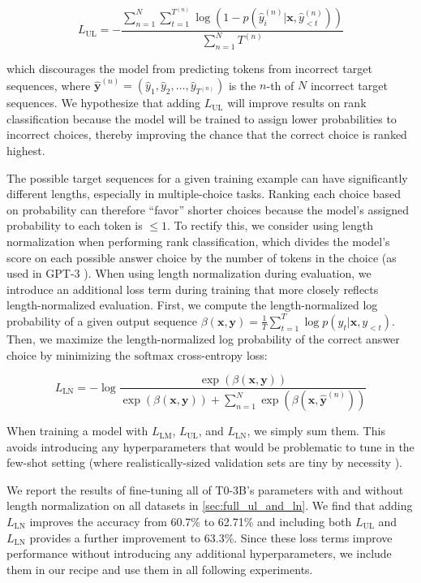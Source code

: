 \begin{equation}
    L_{\mathrm{UL}}=-\frac{ \sum_{n=1}^{N}\sum_{t=1}^{T^{(n)}} \log (1 - p(\hat{y}^{(n)}_i | \mathbf{x}, \hat{y}^{(n)}_{<t}))}{\sum_{n=1}^{N} T^{(n)}}
\end{equation}

which discourages the model from predicting tokens from incorrect target sequences, where  $\mathbf{\hat{y}}^{(n)} = (\hat{y}_1, \hat{y}_2, \dots, \hat{y}_{T^{(n)}})$ is the $n$-th of $N$ incorrect target sequences. We hypothesize that adding $L_{\mathrm{UL}}$ will improve results on rank classification because the model will be trained to assign lower probabilities to incorrect choices, thereby improving the chance that the correct choice is ranked highest.

The possible target sequences for a given training example can have significantly different lengths, especially in multiple-choice tasks. Ranking each choice based on probability can therefore ``favor'' shorter choices because the model's assigned probability to each token is $\le 1$. To rectify this, we consider using length normalization when performing rank classification, which divides the model's score on each possible answer choice by the number of tokens in the choice (as used in GPT-3 \citep{brown2020language}). When using length normalization during evaluation, we introduce an additional loss term during training that more closely reflects length-normalized evaluation. First, we compute the length-normalized log probability of a given output sequence $\beta(\mathbf{x}, \mathbf{y}) = \frac{1}{T} \sum_{t=1}^{T} \log p(y_t|\mathbf{x}, y_{<t})$. Then, we maximize the length-normalized log probability of the correct answer choice by minimizing the $\mathrm{softmax}$ cross-entropy loss:

\begin{equation}
    L_{\mathrm{LN}}= -\log \frac{ \exp(\beta(\mathbf{x}, \mathbf{y}))}{\exp(\beta(\mathbf{x}, \mathbf{y})) + \sum_{n=1}^{N} \exp(\beta(\mathbf{x}, \mathbf{\hat{y}}^{(n)}))}
\end{equation}

When training a model with $L_{\mathrm{LM}}$, $L_{\mathrm{UL}}$, and $L_{\mathrm{LN}}$, we simply sum them. This avoids introducing any hyperparameters that would be problematic to tune in the few-shot setting (where realistically-sized validation sets are tiny by necessity \cite{perez2021true,oliver2018realistic}).

We report the results of fine-tuning all of T0-3B's parameters with and without length normalization on all datasets in \ref{sec:full_ul_and_ln}.
We find that adding $L_{\mathrm{LN}}$ improves the accuracy from 60.7\% to 62.71\% and including both $L_{\mathrm{UL}}$ and $L_{\mathrm{LN}}$ provides a further improvement to 63.3\%.
Since these loss terms improve performance without introducing any additional hyperparameters, we include them in our recipe and use them in all following experiments.


